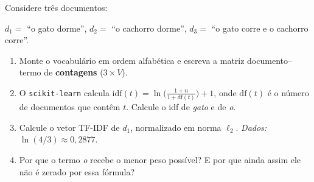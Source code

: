 \documentclass[11pt,a4paper]{article}
\begin{document}

\begin{exercicio}
Considere três documentos:
\begin{center}\small
$d_1 = $ ``o gato dorme'', \qquad
$d_2 = $ ``o cachorro dorme'', \qquad
$d_3 = $ ``o gato corre e o cachorro corre''.
\end{center}
\begin{enumerate}[label=(\alph*),leftmargin=1.1cm]
  \item Monte o vocabulário em ordem alfabética e escreva a matriz
        documento--termo de \textbf{contagens} ($3\times V$).
  \item O \texttt{scikit-learn} calcula
        $\mathrm{idf}(t) = \ln\!\big(\tfrac{1+n}{1+\mathrm{df}(t)}\big) + 1$,
        onde $\mathrm{df}(t)$ é o número de documentos que contêm $t$. Calcule o
        idf de \emph{gato} e de \emph{o}.
  \item Calcule o vetor TF-IDF de $d_1$, normalizado em norma $\ell_2$.
        \emph{Dados:} $\ln(4/3) \approx 0{,}2877$.
  \item Por que o termo \emph{o} recebe o menor peso possível? E por que ainda
        assim ele não é zerado por essa fórmula?
\end{enumerate}
\end{exercicio}
\end{document}
